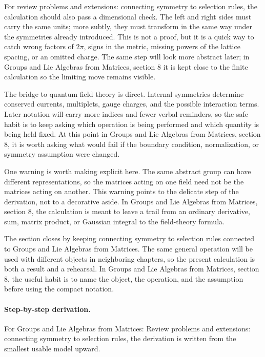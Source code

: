 For review problems and extensions: connecting symmetry to selection rules, the calculation should also pass a dimensional check.  The left and right sides must carry the same units; more subtly, they must transform in the same way under the symmetries already introduced.  This is not a proof, but it is a quick way to catch wrong factors of \(2\pi\), signs in the metric, missing powers of the lattice spacing, or an omitted charge.  The same step will look more abstract later; in Groups and Lie Algebras from Matrices, section 8 it is kept close to the finite calculation so the limiting move remains visible.

The bridge to quantum field theory is direct.  Internal symmetries determine conserved currents, multiplets, gauge charges, and the possible interaction terms.  Later notation will carry more indices and fewer verbal reminders, so the safe habit is to keep asking which operation is being performed and which quantity is being held fixed.  At this point in Groups and Lie Algebras from Matrices, section 8, it is worth asking what would fail if the boundary condition, normalization, or symmetry assumption were changed.

One warning is worth making explicit here.  The same abstract group can have different representations, so the matrices acting on one field need not be the matrices acting on another.  This warning points to the delicate step of the derivation, not to a decorative aside.  In Groups and Lie Algebras from Matrices, section 8, the calculation is meant to leave a trail from an ordinary derivative, sum, matrix product, or Gaussian integral to the field-theory formula.

The section closes by keeping connecting symmetry to selection rules connected to Groups and Lie Algebras from Matrices.  The same general operation will be used with different objects in neighboring chapters, so the present calculation is both a result and a rehearsal.  In Groups and Lie Algebras from Matrices, section 8, the useful habit is to name the object, the operation, and the assumption before using the compact notation.



\paragraph{Step-by-step derivation.}

For Groups and Lie Algebras from Matrices: Review problems and extensions: connecting symmetry to selection rules, the derivation is written from the smallest usable model upward.


